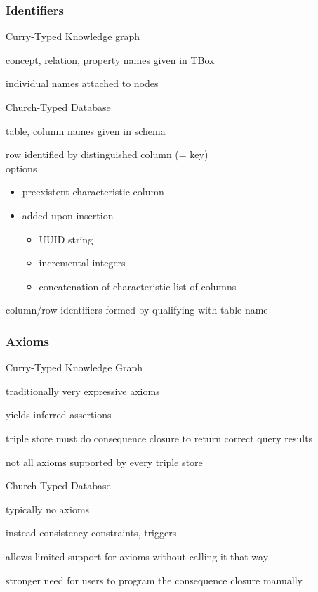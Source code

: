 \begin{frame}\frametitle{Identifiers}
\begin{blockitems}{Curry-Typed Knowledge graph}
\item concept, relation, property names given in TBox
\item individual names attached to nodes
\end{blockitems}

\begin{blockitems}{Church-Typed Database}
\item table, column names given in schema
\item row identified by distinguished column (= key) \\
options
 \begin{itemize}
 \item preexistent characteristic column
 \item added upon insertion
  \begin{itemize}
  \item UUID string
  \item incremental integers
  \item concatenation of characteristic list of columns
  \end{itemize} 
 \end{itemize}
\item column/row identifiers formed by qualifying with table name
\end{blockitems}
\end{frame}

\begin{frame}\frametitle{Axioms}
\begin{blockitems}{Curry-Typed Knowledge Graph}
\item traditionally very expressive axioms
\item yields inferred assertions
\item triple store must do consequence closure to return correct query results
\item not all axioms supported by every triple store
\end{blockitems}

\begin{blockitems}{Church-Typed Database}
\item typically no axioms
\item instead consistency constraints, triggers
\item allows limited support for axioms without calling it that way
\item stronger need for users to program the consequence closure manually
\end{blockitems}
\end{frame}

